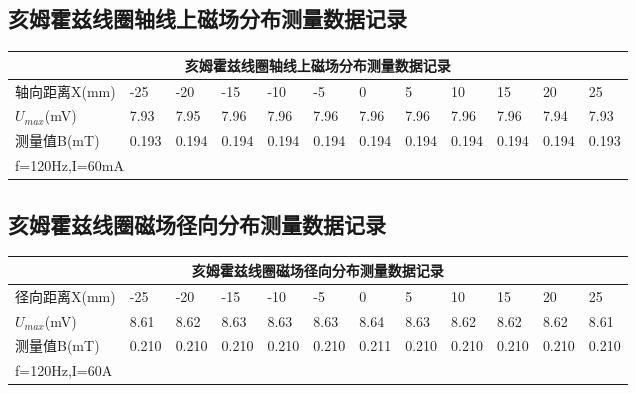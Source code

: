 \documentclass[UTF-8,twoside,cs4size]{ctexart}
\begin{document}
    \subsection{亥姆霍兹线圈轴线上磁场分布测量数据记录}
        \begin{table}[!h]
            \centering
            \begin{tabular}{|l|l|l|l|l|l|l|l|l|l|l|l|}
            \hline
                \multicolumn{12}{|c|}{亥姆霍兹线圈轴线上磁场分布测量数据记录}  \\ \hline
                轴向距离X(mm) & -25 & -20 & -15 & -10 & -5 & 0 & 5 & 10 & 15 & 20 & 25 \\ \hline
                $U_{max}$(mV) & 7.93 & 7.95 & 7.96 & 7.96 & 7.96 & 7.96 & 7.96 & 7.96 & 7.96 & 7.94 & 7.93 \\ \hline
                测量值B(mT) & 0.193 & 0.194 & 0.194 & 0.194 & 0.194 & 0.194 & 0.194 & 0.194 & 0.194 & 0.194 & 0.193 \\ \hline
                \multicolumn{12}{|l|}{f=120Hz,I=60mA} \\ \hline
            \end{tabular}
        \end{table}
    
    \subsection{亥姆霍兹线圈磁场径向分布测量数据记录}
        \begin{table}[!h]
            \centering
            \begin{tabular}{|l|l|l|l|l|l|l|l|l|l|l|l|}
            \hline
                \multicolumn{12}{|c|}{亥姆霍兹线圈磁场径向分布测量数据记录} \\ \hline
                径向距离X(mm) & -25 & -20 & -15 & -10 & -5 & 0 & 5 & 10 & 15 & 20 & 25 \\ \hline
                $U_{max}$(mV) & 8.61 & 8.62 & 8.63 & 8.63 & 8.63 & 8.64 & 8.63 & 8.62 & 8.62 & 8.62 & 8.61 \\ \hline
                测量值B(mT) & 0.210 & 0.210 & 0.210 & 0.210 & 0.210 & 0.211 & 0.210 & 0.210 & 0.210 & 0.210 & 0.210 \\ \hline
                \multicolumn{12}{|l|}{f=120Hz,I=60A} \\ \hline
            \end{tabular}
        \end{table}
\end{document}
